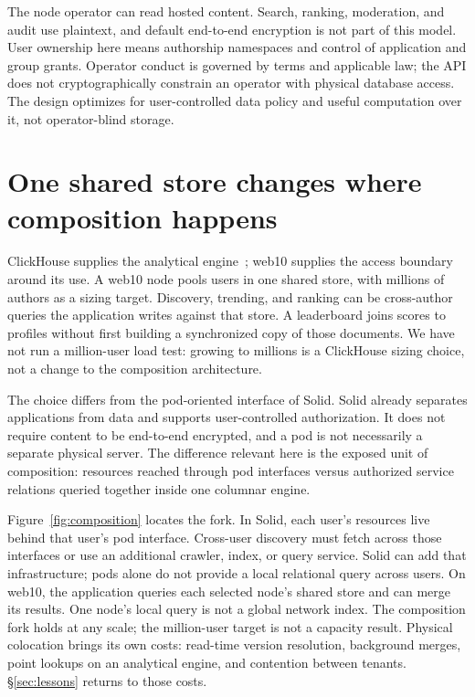 \documentclass[sigconf, nonacm]{acmart}
\begin{document}
The node operator can read hosted content. Search, ranking, moderation,
and audit use plaintext, and default end-to-end encryption is not part
of this model. User ownership here means authorship namespaces and
control of application and group grants. Operator conduct is governed
by terms and applicable law; the API does not cryptographically constrain
an operator with physical database access. The design optimizes for
user-controlled data policy and useful computation over it, not
operator-blind storage.

\section{One shared store changes where composition happens}
\label{sec:store}

ClickHouse supplies the analytical engine~\cite{clickhouse2024}; web10
supplies the access boundary around its use. A web10 node pools users in
one shared store, with millions of authors as a sizing target. Discovery,
trending, and ranking can be cross-author queries the application writes
against that store. A leaderboard joins scores to profiles without first
building a synchronized copy of those documents. We have not run a
million-user load test: growing to millions is a ClickHouse sizing choice,
not a change to the composition architecture.

The choice differs from the pod-oriented interface of Solid.
Solid already separates applications from data and supports
user-controlled authorization. It does not require content to be
end-to-end encrypted, and a pod is not necessarily a separate physical
server. The difference relevant here is the exposed unit of composition:
resources reached through pod interfaces versus authorized service
relations queried together inside one columnar engine.

Figure~\ref{fig:composition} locates the fork. In Solid, each user's
resources live behind that user's pod interface. Cross-user discovery
must fetch across those interfaces or use an additional crawler, index,
or query service. Solid can add that infrastructure; pods alone do not
provide a local relational query across users. On web10, the application
queries each selected node's shared store and can merge its results.
One node's local query is not a global network index. The composition
fork holds at any scale; the million-user target is not a capacity result.
Physical colocation brings its own costs:
read-time version resolution, background merges, point lookups on an
analytical engine, and contention between tenants. \S\ref{sec:lessons}
returns to those costs.
\end{document}
